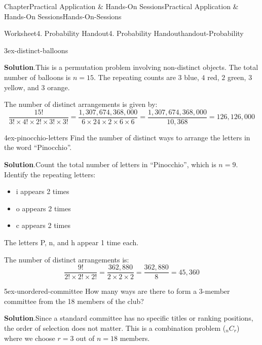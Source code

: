 \documentclass[oneside,10pt,]{book}
\newcommand{\blocktitlefont}{\relax}
\newcommand{\ptxlistdisc}{\raisebox{0.3ex}{\textbullet}}
\begin{document}
\begin{chapterptx}{Chapter}{Practical Application \& Hands-On Sessions}{}{Practical Application \& Hands-On Sessions}{}{}{Hands-On-Sessions}
\begin{worksheet-section}{Worksheet}{4. Probability Handout}{}{4. Probability Handout}{}{}{handout-Probability}
\begin{divisionexercise}{3}{}{}{ex-distinct-balloons}
\par\smallskip%
\noindent\textbf{\blocktitlefont Solution}.\hypertarget{ex-distinct-balloons-2}{}\quad{}This is a permutation problem involving non-distinct objects. The total number of balloons is \(n = 15\). The repeating counts are \(3\) blue, \(4\) red, \(2\) green, \(3\) yellow, and \(3\) orange.%
\par
The number of distinct arrangements is given by:%
\begin{equation*}
\frac{15!}{3! \times 4! \times 2! \times 3! \times 3!} = \frac{1,307,674,368,000}{6 \times 24 \times 2 \times 6 \times 6} = \frac{1,307,674,368,000}{10,368} = 126,126,000
\end{equation*}
%
\end{divisionexercise}%
\begin{divisionexercise}{4}{}{}{ex-pinocchio-letters}%
Find the number of distinct ways to arrange the letters in the word \textquotedblleft{}Pinocchio\textquotedblright{}.%
\par\smallskip%
\noindent\textbf{\blocktitlefont Solution}.\hypertarget{ex-pinocchio-letters-2}{}\quad{}Count the total number of letters in \textquotedblleft{}Pinocchio\textquotedblright{}, which is \(n = 9\). Identify the repeating letters:%
\begin{itemize}[label=\ptxlistdisc]
\item{}i appears 2 times%
\item{}o appears 2 times%
\item{}c appears 2 times%
\end{itemize}
The letters P, n, and h appear 1 time each.%
\par
The number of distinct arrangements is:%
\begin{equation*}
\frac{9!}{2! \times 2! \times 2!} = \frac{362,880}{2 \times 2 \times 2} = \frac{362,880}{8} = 45,360
\end{equation*}
%
\end{divisionexercise}%
\begin{divisionexercise}{5}{}{}{ex-unordered-committee}%
How many ways are there to form a 3-member committee from the 18 members of the club?%
\par\smallskip%
\noindent\textbf{\blocktitlefont Solution}.\hypertarget{ex-unordered-committee-2}{}\quad{}Since a standard committee has no specific titles or ranking positions, the order of selection does not matter. This is a combination problem (\(_nC_r\)) where we choose \(r = 3\) out of \(n = 18\) members.%
\begin{equation*}

\end{equation*}
\end{divisionexercise}
\end{worksheet-section}
\end{chapterptx}
\end{document}
